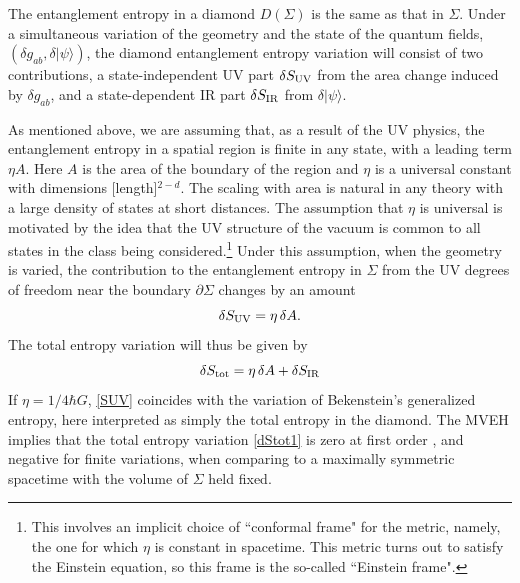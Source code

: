 \documentclass[aps,prd,showpacs,groupedaddress,nofootinbib,longbibliography,12pt]{revtex4-1}
\def\beq{\begin{equation}}
\def\eeq{\end{equation}}
\def\ra{\rangle}
\def\d{\delta}\def\D{\Delta}
\def\l{\lambda}
\def\S{\Sigma }
\def\vphi{\varphi}
\begin{document}

The entanglement entropy in a diamond $D(\Sigma)$ is the same as that in $\Sigma$.
Under a simultaneous variation of the geometry and the state of the quantum fields,
$(\d g_{ab}, \d|\psi\ra)$, the diamond entanglement entropy variation will consist of two 
contributions, a state-independent UV part 
$\d S_{\rm UV}$ from the area change induced by $\d g_{ab}$, and a state-dependent 
IR part $\d S_{\rm IR}$ from $\d|\psi\ra$. 

As mentioned above, we are assuming that, as a result of the UV physics, the entanglement entropy in a spatial
region is finite in any state, with a leading term $\eta A$. Here $A$ is the area of the boundary of the region and 
$\eta$ is a universal constant with dimensions [length]${}^{2-d}$.
The scaling with area is natural in any theory with a large density of states at short distances. The assumption that $\eta$ is universal is motivated by the idea that the UV structure of the vacuum is common to all states in the class being considered.\footnote{This involves an implicit choice of ``conformal frame" \cite{Flanagan:2004bz} for the metric, namely, the one for which $\eta$ is constant in spacetime. This metric turns out to satisfy the Einstein equation, so this frame is the so-called ``Einstein frame".}
Under this assumption, when the geometry is varied, the contribution to the entanglement entropy in 
$\S$ from the UV degrees of freedom near the boundary  $\partial\Sigma$
changes by an amount
%
\beq\label{SUV}
\d S_{\rm UV}=\eta\, \d A. 
\eeq
%
The total entropy variation will thus be given by 
%
\beq\label{dStot1}
\d S_{\rm tot} = \eta\, \d A + \d S_{\rm IR}
\eeq
%
If $\eta=1/4\hbar G$, \eqref{SUV} coincides with 
the variation of Bekenstein's generalized entropy, here interpreted as simply the total entropy in the diamond.
The MVEH implies that the total entropy variation \eqref{dStot1} is zero at first order , and negative for finite 
variations, when comparing to a maximally symmetric spacetime with 
the volume of $\S$ held fixed. 
\end{document}
